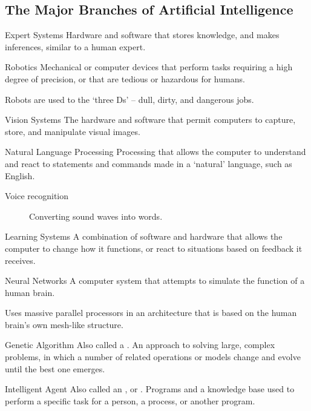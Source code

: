 \documentclass[\main/notes.tex]{subfiles}
\begin{document}
			\subsection{The Major Branches of Artificial Intelligence}
				\begin{definition}{Expert Systems}
						Hardware and software that stores knowledge, and makes inferences, similar to a human expert.
				\end{definition}
				\begin{definition}{Robotics}
					Mechanical or computer devices that perform tasks requiring a high degree of precision, or that are tedious or hazardous for humans.

					Robots are used to the `three Ds' -- dull, dirty, and dangerous jobs.
				\end{definition}
				\begin{definition}{Vision Systems}
					The hardware and software that permit computers to capture, store, and manipulate visual images.
				\end{definition}
				\begin{definition}{Natural Language Processing}
					Processing that allows the computer to understand and react to statements and commands made in a `natural' language, such as English.
					\begin{indentparagraph}
						\begin{description}
							\item[Voice recognition] Converting sound waves into words.
						\end{description}
					\end{indentparagraph}
				\end{definition}
				\begin{definition}{Learning Systems}
					A combination of software and hardware that allows the computer to change how it functions, or react to situations based on feedback it receives.
				\end{definition}
				\begin{definition}{Neural Networks}
					A computer system that attempts to simulate the function of a human brain.

					Uses massive parallel processors in an architecture that is based on the human brain's own mesh-like structure.
				\end{definition}
				\begin{definition}{Genetic Algorithm}
					Also called a . An approach to solving large, complex problems, in which a number of related operations or models change and evolve until the best one emerges.
				\end{definition}
				\begin{definition}{Intelligent Agent}
					Also called an , or . Programs and a knowledge base used to perform a specific task for a person, a process, or another program.
				\end{definition}
\end{document}
